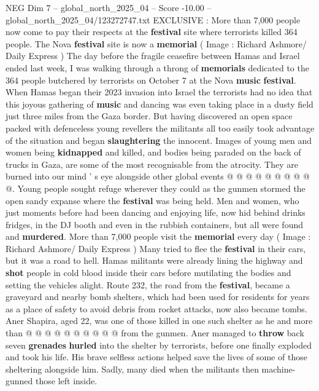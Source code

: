 \begin{textsample}{NEG Dim 7 – global\_north\_2025\_04 – Score -10.00 – global\_north\_2025\_04/123272747.txt}  \label{ex:f7_neg_092}
EXCLUSIVE : More than 7,000 people now come to pay their respects at the \textbf{festival} site where terrorists killed 364 people.
The Nova \textbf{festival} site is now a \textbf{memorial} ( Image : Richard Ashmore/ Daily Express ) The day before the fragile ceasefire between Hamas and Israel ended last week, I was walking through a throng of \textbf{memorials} dedicated to the 364 people butchered by terrorists on October 7 at the Nova \textbf{music} \textbf{festival}.
When Hamas began their 2023 invasion into Israel the terrorists had no idea that this joyous gathering of \textbf{music} and dancing was even taking place in a dusty field just three miles from the Gaza border.
But having discovered an open space packed with defenceless young revellers the militants all too easily took advantage of the situation and began \textbf{slaughtering} the innocent.
Images of young men and women being \textbf{kidnapped} and killed, and bodies being paraded on the back of trucks in Gaza, are some of the most recognisable from the atrocity.
They are burned into our mind ' s eye alongside other global events @ @ @ @ @ @ @ @ @ @.
Young people sought refuge wherever they could as the gunmen stormed the open sandy expanse where the \textbf{festival} was being held.
Men and women, who just moments before had been dancing and enjoying life, now hid behind drinks fridges, in the DJ booth and even in the rubbish containers, but all were found and \textbf{murdered}.
More than 7,000 people visit the \textbf{memorial} every day ( Image : Richard Ashmore/ Daily Express ) Many tried to flee the \textbf{festival} in their cars, but it was a road to hell.
Hamas militants were already lining the highway and \textbf{shot} people in cold blood inside their cars before mutilating the bodies and setting the vehicles alight.
Route 232, the road from the \textbf{festival}, became a graveyard and nearby bomb shelters, which had been used for residents for years as a place of safety to avoid debris from rocket attacks, now also became tombs.
Aner Shapira, aged 22, was one of those killed in one such shelter as he and more than @ @ @ @ @ @ @ @ @ @ from the gunmen.
Aner managed to \textbf{throw} back seven \textbf{grenades} \textbf{hurled} into the shelter by terrorists, before one finally exploded and took his life.
His brave selfless actions helped save the lives of some of those sheltering alongside him.
Sadly, many died when the militants then machine-gunned those left inside.

\end{textsample}
